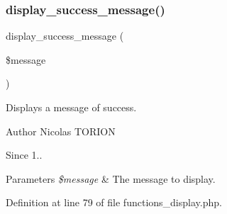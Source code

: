 \subsubsection{\texorpdfstring{display\+\_\+success\+\_\+message()}{display\_success\_message()}}
{\footnotesize\ttfamily display\+\_\+success\+\_\+message (\begin{DoxyParamCaption}\item[{}]{\$message }\end{DoxyParamCaption})}

Displays a message of success.

\begin{DoxyAuthor}{Author}
Nicolas T\+O\+R\+I\+ON 
\end{DoxyAuthor}
\begin{DoxySince}{Since}
1.. 
\end{DoxySince}

\begin{DoxyParams}{Parameters}
{\em \$message} & The message to display. \\
\hline
\end{DoxyParams}


Definition at line 79 of file functions\+\_\+display.\+php.

